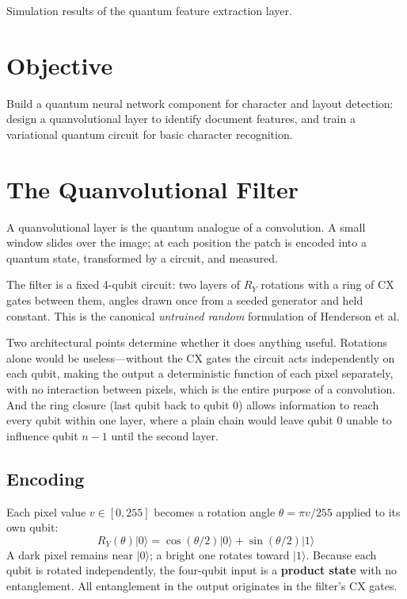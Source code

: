 \documentclass[11pt,a4paper]{article}
\begin{document}
{Simulation results of the quantum feature extraction layer.}

\section{Objective}

Build a quantum neural network component for character and layout detection:
design a quanvolutional layer to identify document features, and train a
variational quantum circuit for basic character recognition.

\section{The Quanvolutional Filter}

A quanvolutional layer is the quantum analogue of a convolution. A small window
slides over the image; at each position the patch is encoded into a quantum
state, transformed by a circuit, and measured.

The filter is a fixed 4-qubit circuit: two layers of $R_Y$ rotations with a ring
of CX gates between them, angles drawn once from a seeded generator and held
constant. This is the canonical \emph{untrained random} formulation of Henderson
et al.

Two architectural points determine whether it does anything useful. Rotations
alone would be useless---without the CX gates the circuit acts independently on
each qubit, making the output a deterministic function of each pixel separately,
with no interaction between pixels, which is the entire purpose of a convolution.
And the ring closure (last qubit back to qubit 0) allows information to reach
every qubit within one layer, where a plain chain would leave qubit 0 unable to
influence qubit $n-1$ until the second layer.

\subsection{Encoding}

Each pixel value $v \in [0,255]$ becomes a rotation angle $\theta = \pi v/255$
applied to its own qubit:
\begin{equation}
R_Y(\theta)|0\rangle = \cos(\theta/2)|0\rangle + \sin(\theta/2)|1\rangle
\end{equation}
A dark pixel remains near $|0\rangle$; a bright one rotates toward $|1\rangle$.
Because each qubit is rotated independently, the four-qubit input is a
\textbf{product state} with no entanglement. All entanglement in the output
originates in the filter's CX gates.
\end{document}
